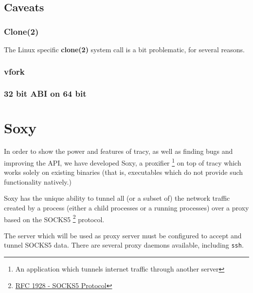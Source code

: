 \documentclass[a4paper, 10pt]{report}
\begin{document}
\section{Caveats}


\subsection{Clone(2)}

The Linux specific \textbf{clone(2)} system call is a bit problematic, for
several reasons.


\subsection{vfork}


\subsection{32 bit ABI on 64 bit}




\chapter{Soxy}
\label{chapter:soxy}

In order to show the power and features of tracy, as well as finding bugs and
improving the API, we have developed Soxy, a proxifier \footnote{An
application which tunnels internet traffic through another server} on top of
tracy which works solely on existing binaries (that is, executables which do
not provide such functionality natively.)

Soxy has the unique ability to tunnel all (or a subset of) the network traffic
created by a process (either a child processes or a running processes) over a
proxy based on the SOCKS5 \footnote{\href{http://www.ietf.org/rfc/rfc1928.txt}
{RFC 1928 - SOCKS5 Protocol}} protocol.

The server which will be used as proxy server must be configured to accept and
tunnel SOCKS5 data. There are several proxy daemons available, including
\verb=ssh=.
\end{document}
